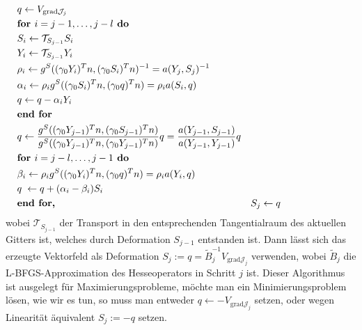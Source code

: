 \begin{defi}
\begin{equation} 
\label{2loopbfgs}
\begin{aligned}
&	\hspace{-2.3cm}	q \leftarrow V_{\text{grad}\mathcal{J}_j} \\
&	\hspace{-2.3cm} \textbf{for } i = j - 1, \dots, j - l \textbf{ do} \\
&	\hspace{-2.3cm} 	S_i \leftarrow \mathcal{T}_{S_{j-1}} S_i \\
&	\hspace{-2.3cm} 	Y_i \leftarrow \mathcal{T}_{S_{j-1}} Y_i \\
&	\hspace{-2.3cm} 	\rho_i \leftarrow g^S((\gamma_0 Y_i)^Tn, (\gamma_0 S_i)^Tn)^{-1} = a(Y_j, S_j)^{-1} \\
&	\hspace{-2.3cm} 	\alpha_i \leftarrow \rho_i g^S((\gamma_0 S_i)^Tn, (\gamma_0 q)^T n) = \rho_i a(S_i, q) \\
&	\hspace{-2.3cm}		q \leftarrow q - \alpha_i Y_i \\
&	\hspace{-2.3cm}     \textbf{end for} \\
&	\hspace{-2.3cm}     q \leftarrow \frac{g^S((\gamma_0 Y_{j-1})^Tn, (\gamma_0 S_{j-1})^Tn)}{g^S((\gamma_0 Y_{j-1})^Tn, (\gamma_0 Y_{j-1})^Tn)}q = \frac{a(Y_{j-1}, S_{j-1})}{a(Y_{j-1}, Y_{j-1})}q \\	
&	\hspace{-2.3cm}     \textbf{for } i = j - l, \dots, j - 1 \textbf{ do} \\
&	\hspace{-2.3cm}   	\beta_i \leftarrow \rho_i g^S((\gamma_0 Y_i)^Tn, (\gamma_0 q)^Tn) = \rho_i a(Y_i, q) \\
&	\hspace{-2.3cm}   	q \;\leftarrow q + (\alpha_i - \beta_i)S_i \\
&	\hspace{-2.3cm}  	\textbf{end for,}
& S_j \leftarrow q
\end{aligned}
\end{equation}
	wobei $\mathcal{T}_{S_{j-1}}$ der Transport in den entsprechenden Tangentialraum des aktuellen Gitters ist, welches durch Deformation $S_{j-1}$ entstanden ist. Dann lässt sich das erzeugte Vektorfeld als Deformation $S_j := q = \tilde{B}_j^{-1}V_{\text{grad}\mathcal{J}_j}$ verwenden, wobei $\tilde{B}_j$ die L-BFGS-Approximation des Hesseoperators in Schritt $j$ ist. Dieser Algorithmus ist ausgelegt für Maximierungsprobleme, möchte man ein Minimierungsproblem lösen, wie wir es tun, so muss man entweder $q \leftarrow -V_{\text{grad}\mathcal{J}_j}$ setzen, oder wegen Linearität äquivalent \newline $S_j := -q$ setzen.
\end{defi}

